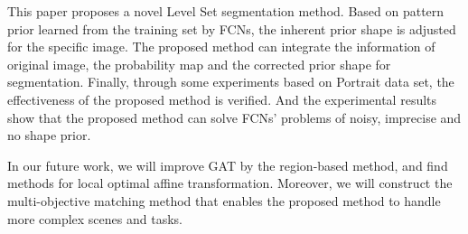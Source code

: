 This paper proposes a novel Level Set segmentation method. Based on pattern prior learned from the training set by FCNs, the inherent prior shape is adjusted for the specific image. The proposed method can integrate the information of original image, the probability map and the corrected prior shape for segmentation. Finally, through some experiments based on Portrait data set, the effectiveness of the proposed method is verified. And the experimental results show that the proposed method can solve FCNs' problems of noisy, imprecise and no shape prior.

In our future work, we will improve GAT by the region-based method, and find methods for local optimal affine transformation. Moreover,  we will construct the multi-objective matching method that enables the proposed method to handle more complex scenes and tasks. 